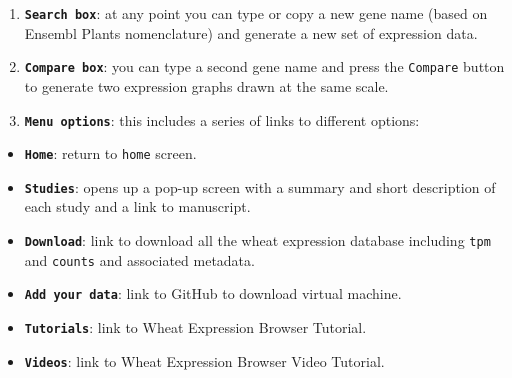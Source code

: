 \begin{enumerate}
\def\labelenumi{\arabic{enumi}.}
\itemsep1pt\parskip0pt
\item
  \textbf{\lstinline!Search box!}: at any point you can type or copy a
  new gene name (based on Ensembl Plants nomenclature) and generate a
  new set of expression data.
\item
  \textbf{\lstinline!Compare box!}: you can type a second gene name and
  press the \lstinline!Compare! button to generate two expression graphs
  drawn at the same scale.
\item
  \textbf{\lstinline!Menu options!}: this includes a series of links to
  different options:\\
\end{enumerate}

\begin{itemize}
\itemsep1pt\parskip0pt
\item
  \textbf{\lstinline!Home!}: return to \lstinline!home! screen.
\item
  \textbf{\lstinline!Studies!}: opens up a pop-up screen with a summary
  and short description of each study and a link to manuscript.
\item
  \textbf{\lstinline!Download!}: link to download all the wheat
  expression database including \lstinline!tpm! and \lstinline!counts!
  and associated metadata.
\item
  \textbf{\lstinline!Add your data!}: link to GitHub to download virtual
  machine.
\item
  \textbf{\lstinline!Tutorials!}: link to Wheat Expression Browser
  Tutorial.
\item
  \textbf{\lstinline!Videos!}: link to Wheat Expression Browser Video
  Tutorial.
\end{itemize}

